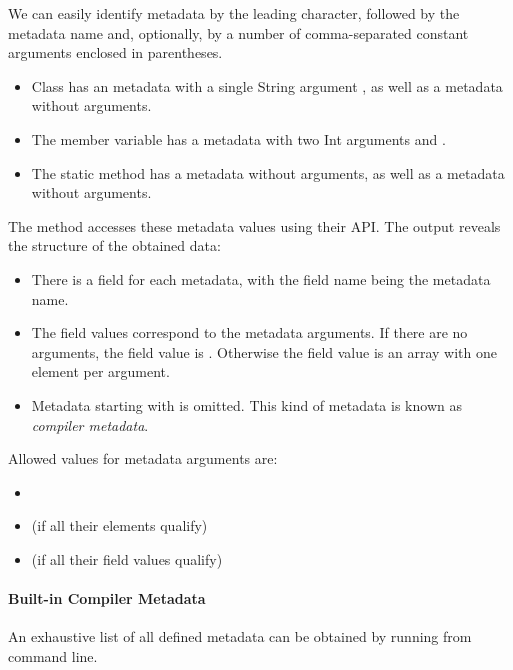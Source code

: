 
We can easily identify metadata by the leading  character, followed by the metadata name and, optionally, by a number of comma-separated constant arguments enclosed in parentheses.

\begin{itemize}
	\item Class  has an  metadata with a single String argument , as well as a  metadata without arguments.
	\item The member variable  has a  metadata with two Int arguments  and .
	\item The static method  has a  metadata without arguments, as well as a  metadata without arguments.
\end{itemize}

The  method accesses these metadata values using their API. The output reveals the structure of the obtained data:

\begin{itemize}
	\item There is a field for each metadata, with the field name being the metadata name.
	\item The field values correspond to the metadata arguments. If there are no arguments, the field value is . Otherwise the field value is an array with one element per argument.
	\item Metadata starting with \expr{:} is omitted. This kind of metadata is known as \emph{compiler metadata}.
\end{itemize}

Allowed values for metadata arguments are:

\begin{itemize}
	\item {}
	\item {} (if all their elements qualify)
	\item {} (if all their field values qualify)
\end{itemize}

\paragraph{Built-in Compiler Metadata}
An exhaustive list of all defined metadata can be obtained by running  from command line.

